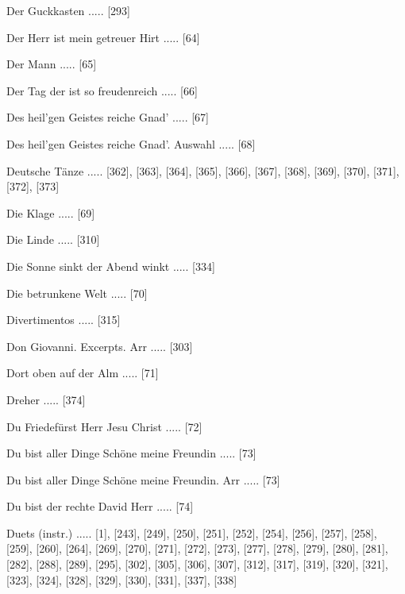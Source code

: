 \documentclass[twocolumn, 12pt]{book}
\begin{document}
\newline 
Der Guckkasten ..... [293]

\newline 
Der Herr ist mein getreuer Hirt ..... [64]

\newline 
Der Mann ..... [65]

\newline 
Der Tag der ist so freudenreich ..... [66]

\newline 
Des heil'gen Geistes reiche Gnad' ..... [67]

\newline 
Des heil'gen Geistes reiche Gnad'. Auswahl ..... [68]

\newline 
Deutsche Tänze ..... [362], [363], [364], [365], [366], [367], [368], [369], [370], [371], [372], [373]

\newline 
Die Klage ..... [69]

\newline 
Die Linde ..... [310]

\newline 
Die Sonne sinkt der Abend winkt ..... [334]

\newline 
Die betrunkene Welt ..... [70]

\newline 
Divertimentos ..... [315]

\newline 
Don Giovanni. Excerpts. Arr ..... [303]

\newline 
Dort oben auf der Alm ..... [71]

\newline 
Dreher ..... [374]

\newline 
Du Friedefürst Herr Jesu Christ ..... [72]

\newline 
Du bist aller Dinge Schöne meine Freundin ..... [73]

\newline 
Du bist aller Dinge Schöne meine Freundin. Arr ..... [73]

\newline 
Du bist der rechte David Herr ..... [74]

\newline 
Duets (instr.) ..... [1], [243], [249], [250], [251], [252], [254], [256], [257], [258], [259], [260], [264], [269], [270], [271], [272], [273], [277], [278], [279], [280], [281], [282], [288], [289], [295], [302], [305], [306], [307], [312], [317], [319], [320], [321], [323], [324], [328], [329], [330], [331], [337], [338]
\end{document}
